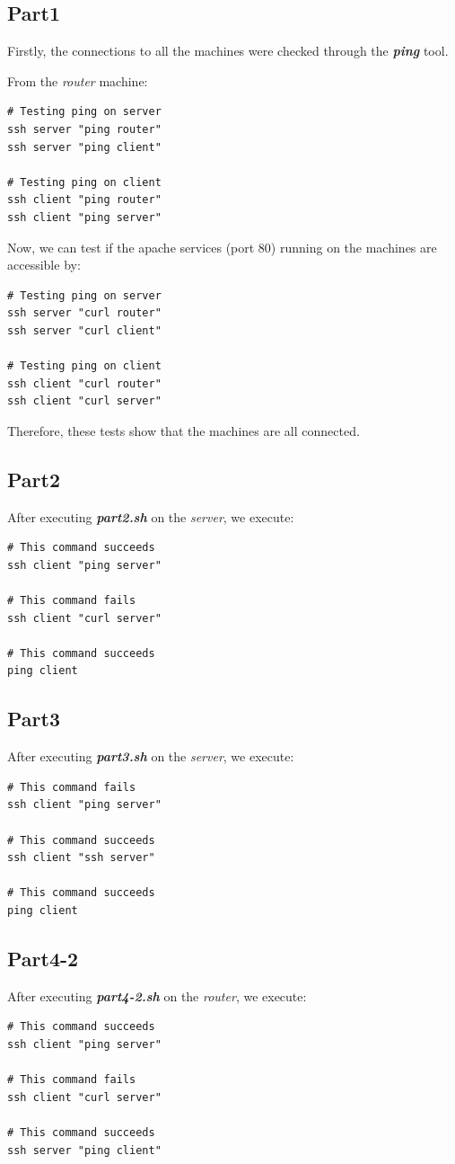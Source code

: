 \documentclass[preprint,12pt]{elsarticle}
\begin{document}
\subsection{Part1}
\label{Part1}
Firstly, the connections to all the machines were checked through the \textbf{\textit{ping}} tool.

From the \textit{router }machine:
\begin{lstlisting}
# Testing ping on server
ssh server "ping router"
ssh server "ping client"

# Testing ping on client
ssh client "ping router"
ssh client "ping server"
\end{lstlisting}

Now, we can test if the apache services  (port 80) running on the machines are accessible by:
\begin{lstlisting}
# Testing ping on server
ssh server "curl router"
ssh server "curl client"

# Testing ping on client
ssh client "curl router"
ssh client "curl server"
\end{lstlisting}

Therefore, these tests show that the machines are all connected.


\subsection{Part2}
\label{Part2}
After executing \textbf{\textit{part2.sh}} on the \textit{server}, we execute:
\begin{lstlisting}
# This command succeeds
ssh client "ping server"

# This command fails
ssh client "curl server"

# This command succeeds
ping client
\end{lstlisting}

\subsection{Part3}
\label{Part3}
After executing \textbf{\textit{part3.sh}} on the \textit{server}, we execute:
\begin{lstlisting}
# This command fails
ssh client "ping server"

# This command succeeds
ssh client "ssh server"

# This command succeeds
ping client
\end{lstlisting}

\subsection{Part4-2}
\label{Part42}
After executing \textbf{\textit{part4-2.sh}} on the \textit{router}, we execute:
\begin{lstlisting}
# This command succeeds
ssh client "ping server"

# This command fails
ssh client "curl server"

# This command succeeds
ssh server "ping client"
\end{lstlisting}
\end{document}
